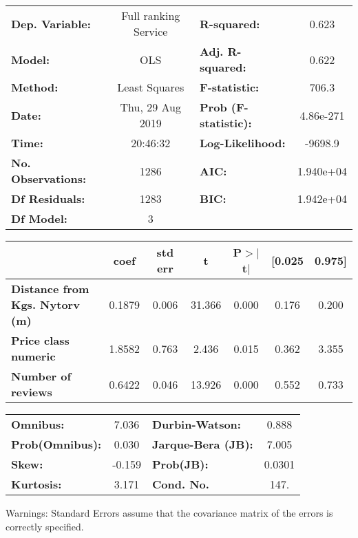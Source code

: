\documentclass{report}
\begin{document}
\begin{center}
\begin{tabular}{lclc}
\toprule
\textbf{Dep. Variable:}                & Full ranking Service & \textbf{  R-squared:         } &     0.623   \\
\textbf{Model:}                        &         OLS          & \textbf{  Adj. R-squared:    } &     0.622   \\
\textbf{Method:}                       &    Least Squares     & \textbf{  F-statistic:       } &     706.3   \\
\textbf{Date:}                         &   Thu, 29 Aug 2019   & \textbf{  Prob (F-statistic):} & 4.86e-271   \\
\textbf{Time:}                         &       20:46:32       & \textbf{  Log-Likelihood:    } &   -9698.9   \\
\textbf{No. Observations:}             &          1286        & \textbf{  AIC:               } & 1.940e+04   \\
\textbf{Df Residuals:}                 &          1283        & \textbf{  BIC:               } & 1.942e+04   \\
\textbf{Df Model:}                     &             3        & \textbf{                     } &             \\
\bottomrule
\end{tabular}
\begin{tabular}{lcccccc}
                                       & \textbf{coef} & \textbf{std err} & \textbf{t} & \textbf{P$>$$|$t$|$} & \textbf{[0.025} & \textbf{0.975]}  \\
\midrule
\textbf{Distance from Kgs. Nytorv (m)} &       0.1879  &        0.006     &    31.366  &         0.000        &        0.176    &        0.200     \\
\textbf{Price class numeric}           &       1.8582  &        0.763     &     2.436  &         0.015        &        0.362    &        3.355     \\
\textbf{Number of reviews}             &       0.6422  &        0.046     &    13.926  &         0.000        &        0.552    &        0.733     \\
\bottomrule
\end{tabular}
\begin{tabular}{lclc}
\textbf{Omnibus:}       &  7.036 & \textbf{  Durbin-Watson:     } &    0.888  \\
\textbf{Prob(Omnibus):} &  0.030 & \textbf{  Jarque-Bera (JB):  } &    7.005  \\
\textbf{Skew:}          & -0.159 & \textbf{  Prob(JB):          } &   0.0301  \\
\textbf{Kurtosis:}      &  3.171 & \textbf{  Cond. No.          } &     147.  \\
\bottomrule
\end{tabular}
\end{center}

Warnings: \newline
 [1] Standard Errors assume that the covariance matrix of the errors is correctly specified.
\end{document}
